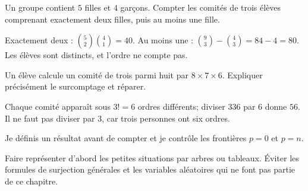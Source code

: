 Un groupe contient $5$ filles et $4$ garçons. Compter les comités de trois élèves comprenant exactement deux filles, puis au moins une fille.
\begin{corrige}\label{sol-t11s-c19-e06}
Exactement deux : $\binom52\binom41=40$. Au moins une : $\binom93-\binom43=84-4=80$. Les élèves sont distincts, et l’ordre ne compte pas.
\end{corrige}
\label{t11s-c19-e07}
Un élève calcule un comité de trois parmi huit par $8\times7\times6$. Expliquer précisément le surcomptage et réparer.
\begin{corrige}\label{sol-t11s-c19-e07}
Chaque comité apparaît sous $3!=6$ ordres différents; diviser $336$ par $6$ donne $56$. Il ne faut pas diviser par $3$, car trois personnes ont six ordres.
\end{corrige}
\begin{jemeteste}Je définis un résultat avant de compter et je contrôle les frontières $p=0$ et $p=n$.\end{jemeteste}
\begin{notepourlaclasse}Faire représenter d’abord les petites situations par arbres ou tableaux. Éviter les formules de surjection générales et les variables aléatoires qui ne font pas partie de ce chapitre.\end{notepourlaclasse}
